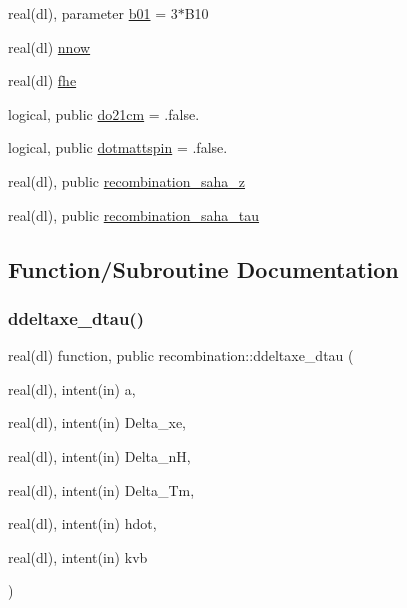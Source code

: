 \begin{DoxyCompactItemize}
\item 
real(dl), parameter \mbox{\hyperlink{namespacerecombination_ac87df6d66d9a2c678cf5712166b0307a}{b01}} = 3$\ast$B10
\item 
real(dl) \mbox{\hyperlink{namespacerecombination_a9c154008489ae26b92e9e4b41df00e80}{nnow}}
\item 
real(dl) \mbox{\hyperlink{namespacerecombination_a0bcf491993bc386ebe7e2f6fafe228a3}{fhe}}
\item 
logical, public \mbox{\hyperlink{namespacerecombination_a7789f3edc0804a55e6ad9e9ad4450848}{do21cm}} = .false.
\item 
logical, public \mbox{\hyperlink{namespacerecombination_ae0472591a7f5d7f85297b5123245e4a5}{dotmattspin}} = .false.
\item 
real(dl), public \mbox{\hyperlink{namespacerecombination_a846415ba803734dc947b1f45e5e7f5ce}{recombination\+\_\+saha\+\_\+z}}
\item 
real(dl), public \mbox{\hyperlink{namespacerecombination_af55a05267a423d23ad90deef0980c751}{recombination\+\_\+saha\+\_\+tau}}
\end{DoxyCompactItemize}


\subsection{Function/\+Subroutine Documentation}
\mbox{\label{namespacerecombination_a7445052618f5f8ed0d793a58eb66c768}} 
\subsubsection{\texorpdfstring{ddeltaxe\+\_\+dtau()}{ddeltaxe\_dtau()}}
{\footnotesize\ttfamily real(dl) function, public recombination\+::ddeltaxe\+\_\+dtau (\begin{DoxyParamCaption}\item[{real(dl), intent(in)}]{a,  }\item[{real(dl), intent(in)}]{Delta\+\_\+xe,  }\item[{real(dl), intent(in)}]{Delta\+\_\+nH,  }\item[{real(dl), intent(in)}]{Delta\+\_\+\+Tm,  }\item[{real(dl), intent(in)}]{hdot,  }\item[{real(dl), intent(in)}]{kvb }\end{DoxyParamCaption})}




